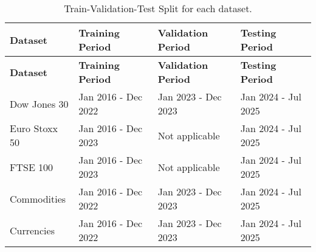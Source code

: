 \begin{longtable}{|l|l|l|l|}
    \caption{Train-Validation-Test Split for each dataset.}
    \label{tab:dataset-split}
    \\
    \hline
    \textbf{Dataset} & \textbf{Training Period} & \textbf{Validation Period} & \textbf{Testing Period} \\ \midrule
    \endfirsthead

    \hline
    \textbf{Dataset} & \textbf{Training Period} & \textbf{Validation Period} & \textbf{Testing Period} \\ \midrule
    \endhead

    \endfoot
    \hline
    Dow Jones 30 & Jan 2016 - Dec 2022 & Jan 2023 - Dec 2023 & Jan 2024 - Jul 2025 \\
    \hline
    Euro Stoxx 50 & Jan 2016 - Dec 2023 & Not applicable & Jan 2024 - Jul 2025 \\
    \hline
    FTSE 100 & Jan 2016 - Dec 2023 & Not applicable & Jan 2024 - Jul 2025 \\
    \hline
    Commodities & Jan 2016 - Dec 2022 & Jan 2023 - Dec 2023 & Jan 2024 - Jul 2025 \\
    \hline
    Currencies & Jan 2016 - Dec 2022 & Jan 2023 - Dec 2023 & Jan 2024 - Jul 2025 \\
    \hline
\end{longtable}